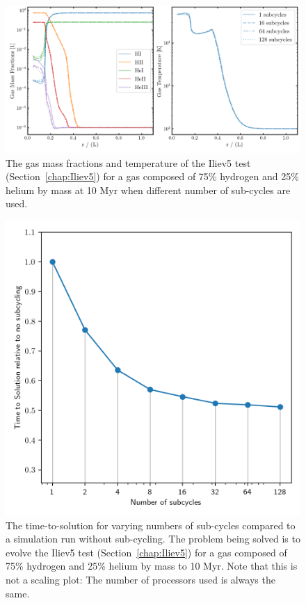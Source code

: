 \begin{figure}
    \centering
    \includegraphics[width=\textwidth]{figures/RHD/subcycling/output_HHe_0008-nsubcycles.png}
    \caption{
The gas mass fractions and temperature of the Iliev5 test (Section~\ref{chap:Iliev5}) for a gas
composed of 75\% hydrogen and 25\% helium by mass at 10 Myr when different number of sub-cycles
are used.
    }
    \label{fig:subcycling-gas}
\end{figure}




\begin{figure}
    \centering
    \includegraphics[width=.6\textwidth]{figures/RHD/subcycling/subcycles-speedup-stromgren.png}
    \caption{
The time-to-solution for varying numbers of sub-cycles compared to a simulation run without
sub-cycling.
The problem being solved is to evolve the Iliev5 test (Section~\ref{chap:Iliev5}) for a gas
composed of 75\% hydrogen and 25\% helium by mass to 10 Myr.
Note that this is not a scaling plot: The number of processors used is always the same.
    }
    \label{fig:subcycling-speedup}
\end{figure}





